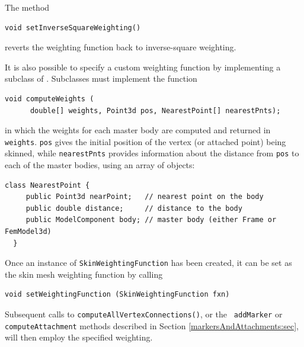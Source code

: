 The method
%
\begin{lstlisting}[]
  void setInverseSquareWeighting()
\end{lstlisting}
%
reverts the weighting function back to inverse-square weighting.

It is also possible to specify a custom weighting function
by implementing a subclass of 
.
Subclasses must implement the function
%
\begin{lstlisting}[]
  void computeWeights (
      double[] weights, Point3d pos, NearestPoint[] nearestPnts);
\end{lstlisting}
%
in which the weights for each master body are computed and returned in
{\tt weights}. {\tt pos} gives the initial position of the vertex (or
attached point) being skinned, while {\tt nearestPnts} provides
information about the distance from {\tt pos} to each of the master
bodies, using an array of
objects:
%
\begin{lstlisting}[]
  class NearestPoint {
     public Point3d nearPoint;   // nearest point on the body
     public double distance;     // distance to the body
     public ModelComponent body; // master body (either Frame or FemModel3d)
  }
\end{lstlisting}
%

Once an instance of {\tt SkinWeightingFunction} has been created,
it can be set as the skin mesh weighting function by calling
%
\begin{lstlisting}[]
  void setWeightingFunction (SkinWeightingFunction fxn)
\end{lstlisting}
%
Subsequent calls to {\tt computeAllVertexConnections()}, or the {\tt
addMarker} or {\tt computeAttachment} methods described in Section
\ref{markersAndAttachments:sec}, will then employ the specified
weighting.

